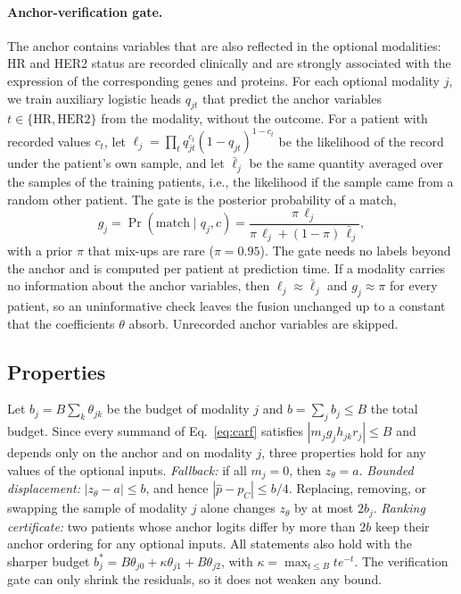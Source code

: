 \documentclass[a4paper,runningheads]{llncs}
\begin{document}
\paragraph{Anchor-verification gate.} The anchor contains variables that are also reflected in the optional modalities: HR and HER2 status are recorded clinically and are strongly associated with the expression of the corresponding genes and proteins. For each optional modality $j$, we train auxiliary logistic heads $q_{jt}$ that predict the anchor variables $t\in\{\mathrm{HR},\mathrm{HER2}\}$ from the modality, without the outcome. For a patient with recorded values $c_t$, let $\ell_j=\prod_t q_{jt}^{c_t}(1-q_{jt})^{1-c_t}$ be the likelihood of the record under the patient's own sample, and let $\bar\ell_j$ be the same quantity averaged over the samples of the training patients, i.e., the likelihood if the sample came from a random other patient. The gate is the posterior probability of a match,
\begin{equation}
 g_j = \Pr(\text{match}\mid q_j, c) = \frac{\pi\,\ell_j}{\pi\,\ell_j+(1-\pi)\,\bar\ell_j},
 \label{eq:gate}
\end{equation}
with a prior $\pi$ that mix-ups are rare ($\pi=0.95$). The gate needs no labels beyond the anchor and is computed per patient at prediction time. If a modality carries no information about the anchor variables, then $\ell_j\approx\bar\ell_j$ and $g_j\approx\pi$ for every patient, so an uninformative check leaves the fusion unchanged up to a constant that the coefficients $\theta$ absorb. Unrecorded anchor variables are skipped.

\subsection{Properties}
\label{sec:properties}

Let $b_j=B\sum_k\theta_{jk}$ be the budget of modality $j$ and $b=\sum_jb_j\le B$ the total budget. Since every summand of Eq.~\eqref{eq:carf} satisfies $|m_jg_jh_{jk}r_j|\le B$ and depends only on the anchor and on modality $j$, three properties hold for any values of the optional inputs. \emph{Fallback:} if all $m_j=0$, then $z_\theta=a$. \emph{Bounded displacement:} $|z_\theta-a|\le b$, and hence $|\hat p-p_C|\le b/4$. Replacing, removing, or swapping the sample of modality $j$ alone changes $z_\theta$ by at most $2b_j$. \emph{Ranking certificate:} two patients whose anchor logits differ by more than $2b$ keep their anchor ordering for any optional inputs. All statements also hold with the sharper budget $b^*_j=B\theta_{j0}+\kappa\theta_{j1}+B\theta_{j2}$, with $\kappa=\max_{t\le B}te^{-t}$. The verification gate can only shrink the residuals, so it does not weaken any bound.
\end{document}
